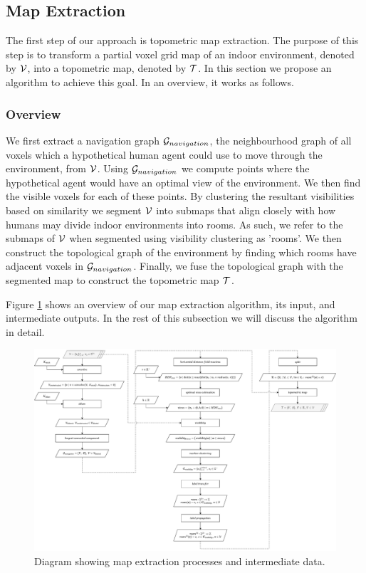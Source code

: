 \subsection{Map Extraction}
The first step of our approach is topometric map extraction.
The purpose of this step is to transform a partial voxel grid map of an indoor environment, denoted by \(\mathcal{V}\), into a topometric map, denoted by \(\mathcal{T}\). In this section we propose an algorithm to achieve this goal. In an overview, it works as follows.

\subsubsection{Overview}
We first extract a navigation graph \(\mathcal{G}_{navigation}\), the neighbourhood graph of all voxels which a hypothetical human agent could use to move through the environment, from \(\mathcal{V}\). Using \(\mathcal{G}_{navigation}\) we compute points where the hypothetical agent would have an optimal view of the environment. We then find the visible voxels for each of these points. By clustering the resultant visibilities based on similarity we segment \(\mathcal{V}\) into submaps that align closely with how humans may divide indoor environments into rooms. As such, we refer to the submaps of \(\mathcal{V}\) when segmented using visibility clustering as 'rooms'. We then construct the topological graph of the environment by finding which rooms have adjacent voxels in \(\mathcal{G}_{navigation}\). Finally, we fuse the topological graph with the segmented map to construct the topometric map \(\mathcal{T}\). 

Figure \ref{fig:map_extract_steps} shows an overview of our map extraction algorithm, its input, and intermediate outputs. In the rest of this subsection we will discuss the algorithm in detail.

\begin{figure}[h]
    \centering
    \includegraphics*[width=1\textwidth]{./fig/flowchart_complete-Map extract.drawio.pdf}
    \caption{Diagram showing map extraction processes and intermediate data.}
    \label{fig:map_extract_steps}
\end{figure}

